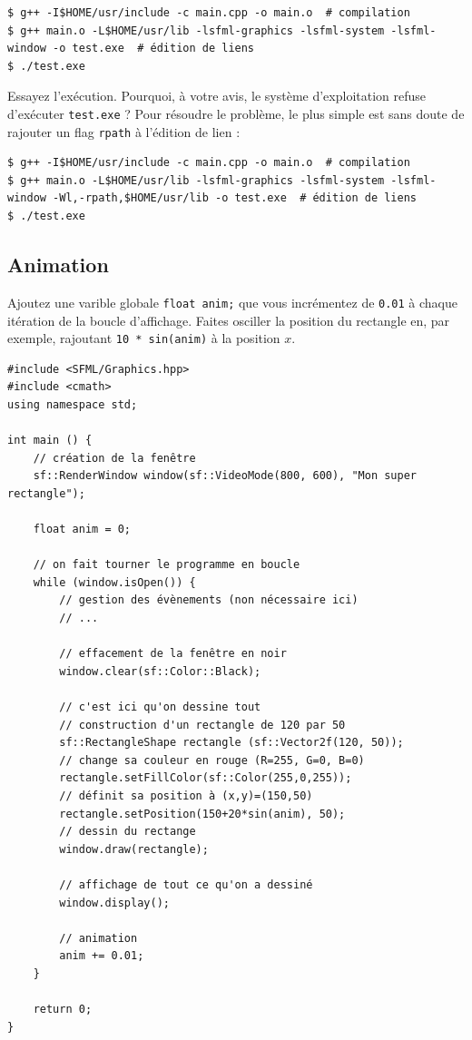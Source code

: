 \documentclass{book}
\newcommand{\inline}[1]{\texttt{#1}}
\def\filename{\texttt}
\begin{document}
\begin{verbatim}
$ g++ -I$HOME/usr/include -c main.cpp -o main.o  # compilation
$ g++ main.o -L$HOME/usr/lib -lsfml-graphics -lsfml-system -lsfml-window -o test.exe  # édition de liens
$ ./test.exe
\end{verbatim}

Essayez l'exécution. Pourquoi, à votre avis, le système d'exploitation refuse d'exécuter \filename{test.exe} ? Pour résoudre le problème, le plus simple est sans doute de rajouter un flag \texttt{rpath} à l'édition de lien :
\begin{verbatim}
$ g++ -I$HOME/usr/include -c main.cpp -o main.o  # compilation
$ g++ main.o -L$HOME/usr/lib -lsfml-graphics -lsfml-system -lsfml-window -Wl,-rpath,$HOME/usr/lib -o test.exe  # édition de liens
$ ./test.exe
\end{verbatim}

\subsection{Animation}

Ajoutez une varible globale \inline{float anim;} que vous incrémentez de \inline{0.01} à chaque itération de la boucle d'affichage. Faites osciller la position du rectangle en, par exemple, rajoutant \inline{10 * sin(anim)} à la position $x$.

\begin{correction}
\begin{verbatim}
#include <SFML/Graphics.hpp>
#include <cmath>
using namespace std;

int main () {
    // création de la fenêtre
    sf::RenderWindow window(sf::VideoMode(800, 600), "Mon super rectangle");

    float anim = 0;

    // on fait tourner le programme en boucle
    while (window.isOpen()) {
        // gestion des évènements (non nécessaire ici)
        // ...

        // effacement de la fenêtre en noir
        window.clear(sf::Color::Black);

        // c'est ici qu'on dessine tout
        // construction d'un rectangle de 120 par 50
        sf::RectangleShape rectangle (sf::Vector2f(120, 50));
        // change sa couleur en rouge (R=255, G=0, B=0)
        rectangle.setFillColor(sf::Color(255,0,255));
        // définit sa position à (x,y)=(150,50)
        rectangle.setPosition(150+20*sin(anim), 50);
        // dessin du rectange
        window.draw(rectangle);

        // affichage de tout ce qu'on a dessiné
        window.display();

        // animation
        anim += 0.01;
    }

    return 0;
}
\end{verbatim}
\end{correction}
\end{document}

